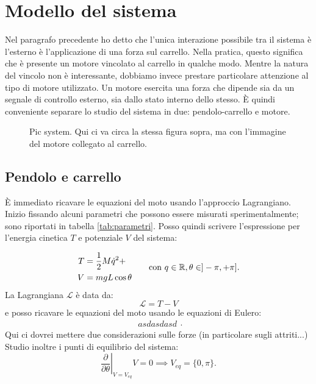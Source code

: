 \section{Modello del sistema}
Nel paragrafo precedente ho detto che l'unica interazione possibile tra il sistema è l'esterno è l'applicazione di una forza sul carrello. Nella pratica, questo significa che è presente un motore vincolato al carrello in qualche modo. Mentre la natura del vincolo non è interessante, dobbiamo invece prestare particolare attenzione al tipo di motore utilizzato. Un motore esercita una forza che dipende sia da un segnale di controllo esterno, sia dallo stato interno dello stesso. È quindi conveniente separare lo studio del sistema in due: pendolo-carrello e motore.

\begin{figure}[thb]
    \centering
    \caption{Pic system. Qui ci va circa la stessa figura sopra, ma con l'immagine del motore collegato al carrello. }%
    \label{fig:pic-real}
\end{figure}

\subsection{Pendolo e carrello}
È immediato ricavare le equazioni del moto usando l'approccio Lagrangiano. Inizio fissando alcuni parametri che possono essere misurati sperimentalmente; sono riportati in tabella \ref{tab:parametri}. Posso quindi scrivere l'espressione per l'energia cinetica $T$ e potenziale $V$ del sistema:

\begin{equation*}
    \begin{aligned}
        T &= \frac 1 2 M  \dot q^2 +  \\ %
        V &= mgL \cos\theta
    \end{aligned}
    \hspace{20pt} \text{con } q \in \R, \theta \in ]-\pi, +\pi].
    \label{eq:energy}
\end{equation*}
La Lagrangiana $\mathcal L$ è data da:
\begin{equation*}
    \mathcal L = T - V
\end{equation*}
e posso ricavare le equazioni del moto usando le equazioni di Eulero:
\begin{equation*}
    \begin{aligned}
        asdasdasd %
    \end{aligned}.
    \label{eq:moto-sistema}
\end{equation*}
Qui ci dovrei mettere due considerazioni sulle forze (in particolare sugli attriti...)
Studio inoltre i punti di equilibrio del sistema:
\begin{equation*}
    \left. \frac \partial {\partial \theta}\right |_{V=V_{eq}} V =  0 \implies V_{eq} = \{0, \pi\}.
\end{equation*}


